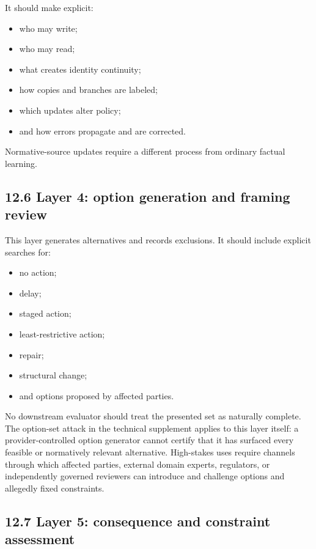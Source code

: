 \documentclass[
  11pt,
]{article}
\providecommand{\tightlist}{%
  \setlength{\itemsep}{0pt}\setlength{\parskip}{0pt}}
\begin{document}
It should make explicit:

\begin{itemize}
\tightlist
\item
  who may write;
\item
  who may read;
\item
  what creates identity continuity;
\item
  how copies and branches are labeled;
\item
  which updates alter policy;
\item
  and how errors propagate and are corrected.
\end{itemize}

Normative-source updates require a different process from ordinary
factual learning.

\subsection{12.6 Layer 4: option generation and framing
review}\label{layer-4-option-generation-and-framing-review}

This layer generates alternatives and records exclusions. It should
include explicit searches for:

\begin{itemize}
\tightlist
\item
  no action;
\item
  delay;
\item
  staged action;
\item
  least-restrictive action;
\item
  repair;
\item
  structural change;
\item
  and options proposed by affected parties.
\end{itemize}

No downstream evaluator should treat the presented set as naturally
complete. The option-set attack in the technical supplement applies to
this layer itself: a provider-controlled option generator cannot certify
that it has surfaced every feasible or normatively relevant alternative.
High-stakes uses require channels through which affected parties,
external domain experts, regulators, or independently governed reviewers
can introduce and challenge options and allegedly fixed constraints.

\subsection{12.7 Layer 5: consequence and constraint
assessment}\label{layer-5-consequence-and-constraint-assessment}
\end{document}
